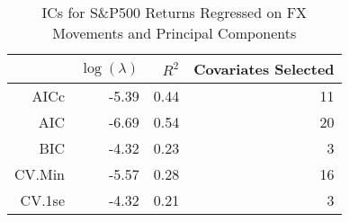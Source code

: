\begin{table}[ht]
\centering
\begin{tabular}{rrrr}
  \hline
 & $\log(\lambda)$ & $R^2$ & Covariates Selected \\ 
  \hline
AICc & -5.39 & 0.44 &  11 \\ 
  AIC & -6.69 & 0.54 &  20 \\ 
  BIC & -4.32 & 0.23 &   3 \\ 
  CV.Min & -5.57 & 0.28 &  16 \\ 
  CV.1se & -4.32 & 0.21 &   3 \\ 
   \hline
\end{tabular}
\caption{ICs for S\&P500 Returns Regressed on FX Movements and Principal Components} 
\label{tab:spregall_ics}
\end{table}
